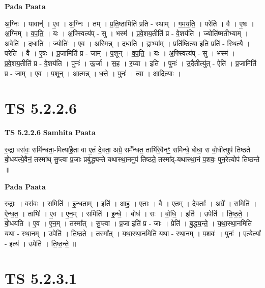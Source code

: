 \documentclass[17pt]{extarticle}
\begin{document}
\textbf{Pada Paata} \newline

अ॒ग्निः । यावान्॑ । ए॒व । अ॒ग्निः । तम् । प्र॒ति॒ष्ठामिति॑ प्रति - स्थाम् । ग॒म॒य॒ति॒ । परेति॑ । वै । ए॒षः । अ॒ग्निम् । व॒प॒ति॒ । यः । अ॒फ्स्वित्य॑प् - सु । भस्म॑ । प्र॒वे॒शय॒तीति॑ प्र - वे॒शय॑ति । ज्योति॑ष्मतीभ्याम् । अवेति॑ । द॒धा॒ति॒ । ज्योतिः॑ । ए॒व । अ॒स्मि॒न्न् । द॒धा॒ति॒ । द्वाभ्या᳚म् । प्रति॑ष्ठित्या॒ इति॒ प्रति॑ - स्थि॒त्यै॒ । परेति॑ । वै । ए॒षः । प्र॒जामिति॑ प्र - जाम् । प॒शून् । व॒प॒ति॒ । यः । अ॒फ्स्वित्य॑प् - सु । भस्म॑ । प्र॒वे॒शय॒तीति॑ प्र - वे॒शय॑ति । पुनः॑ । ऊ॒र्जा । स॒ह । र॒य्या । इति॑ । पुनः॑ । उ॒दैतीत्यु॑त् - ऐति॑ । प्र॒जामिति॑ प्र - जाम् । ए॒व । प॒शून् । आ॒त्मन्न् । ध॒त्ते॒ । पुनः॑ । त्वा॒ । आ॒दि॒त्याः ।  \newline




\section*{ TS 5.2.2.6 }

\textbf{TS 5.2.2.6 } \newline
\textbf{Samhita Paata} \newline

रु॒द्रा वस॑वः॒ समि॑न्धता॒-मित्या॑है॒ता वा ए॒तं दे॒वता॒ अग्रे॒ समै᳚न्धत॒ ताभि॑रे॒वैनꣳ॒॒ समि॑न्धे॒ बोधा॒ स बो॒धीत्युप॑ तिष्ठते बो॒धय॑त्ये॒वैनं॒ तस्मा᳚थ् सु॒प्त्वा प्र॒जाः प्रबु॑द्ध्यन्ते यथास्था॒नमुप॑ तिष्ठते॒ तस्मा᳚द्-यथास्था॒नं प॒शवः॒ पुन॒रेत्योप॑ तिष्ठन्ते ॥ \newline

\textbf{Pada Paata} \newline

रु॒द्राः । वस॑वः । समिति॑ । इ॒न्ध॒ता॒म् । इति॑ । आ॒ह॒ । ए॒ताः । वै । ए॒तम् । दे॒वताः᳚ । अग्रे᳚ । समिति॑ । ऐ॒न्ध॒त॒ । ताभिः॑ । ए॒व । ए॒न॒म् । समिति॑ । इ॒न्धे॒ । बोध॑ । सः । बो॒धि॒ । इति॑ । उपेति॑ । ति॒ष्ठ॒ते॒ । बो॒धय॑ति । ए॒व । ए॒न॒म् । तस्मा᳚त् । सु॒प्त्वा । प्र॒जा इति॑ प्र - जाः । प्रेति॑ । बु॒द्ध्य॒न्ते॒ । य॒था॒स्था॒नमिति॑ यथा - स्था॒नम् । उपेति॑ । ति॒ष्ठ॒ते॒ । तस्मा᳚त् । य॒था॒स्था॒नमिति॑ यथा - स्था॒नम् । प॒शवः॑ । पुनः॑ । एत्येत्या᳚ - इत्य॑ । उपेति॑ । ति॒ष्ठ॒न्ते॒ ॥  \newline




\section*{ TS 5.2.3.1 }
\end{document}
